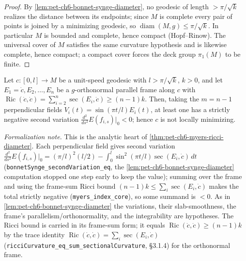 \begin{proof}
  By \cref{lem:pet-ch6-bonnet-synge-diameter}, no geodesic of length
  $>\pi/\sqrt k$ realizes the distance between its endpoints; since $M$ is
  complete every pair of points is joined by a minimizing geodesic, so
  $\operatorname{diam}(M,g)\le\pi/\sqrt k$. In particular $M$ is bounded and complete,
  hence compact (Hopf--Rinow). The universal cover of $M$ satisfies the same
  curvature hypothesis and is likewise complete, hence compact; a compact
  cover forces the deck group $\pi_1(M)$ to be finite.
\end{proof}

\begin{lemma}
  \label{lem:pet-ch6-myers-index}
  \leanok
  Let $c:[0,l]\to M$ be a unit-speed geodesic with $l>\pi/\sqrt k$, $k>0$, and let
  $E_1=\dot c,E_2,\dots,E_n$ be a $g$-orthonormal parallel frame along $c$ with
  $\operatorname{Ric}(\dot c,\dot c)=\sum_{i=2}^n\sec(E_i,\dot c)\ge(n-1)k$. Then, taking the
  $m=n-1$ perpendicular fields $V_i(t)=\sin(\pi t/l)E_i(t)$, at least one has a strictly
  negative second variation $\tfrac{d^2}{ds^2}E(f_{i,s})|_0<0$; hence $c$ is not locally
  minimizing.

  \emph{Formalization note.} This is the analytic heart of \cref{thm:pet-ch6-myers-ricci-diameter}.
  Each perpendicular field gives second variation
  $\tfrac{d^2}{ds^2}E(f_{i,s})|_0=(\pi/l)^2(l/2)-\int_0^l\sin^2(\pi t/l)\sec(E_i,\dot c)\,dt$
  (\texttt{bonnetSynge\_secondVariation\_eq}, the \cref{lem:pet-ch6-bonnet-synge-diameter}
  computation stopped one step early to keep the value); summing over the frame and using the
  frame-sum Ricci bound $(n-1)k\le\sum_i\sec(E_i,\dot c)$ makes the total strictly negative
  (\texttt{myers\_index\_core}), so some summand is $<0$. As in
  \cref{lem:pet-ch6-bonnet-synge-diameter} the variations, their slab-smoothness, the frame's
  parallelism/orthonormality, and the integrability are hypotheses. The Ricci bound is carried in
  its frame-sum form; it equals $\operatorname{Ric}(\dot c,\dot c)\ge(n-1)k$ by the trace identity
  $\operatorname{Ric}(\dot c,\dot c)=\sum_i\sec(E_i,\dot c)$
  (\texttt{ricciCurvature\_eq\_sum\_sectionalCurvature}, §3.1.4) for the orthonormal frame.
\end{lemma}
